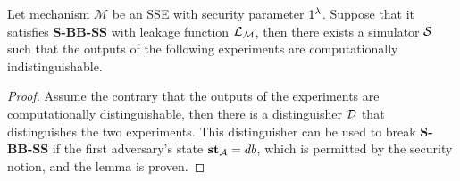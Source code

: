 \begin{lemma} \label{Lemma: S-BB-SS with db}
	\normalfont
	Let mechanism $\mathcal{M}$ be an SSE with security parameter $1^{\lambda}$. Suppose that it satisfies \textbf{S-BB-SS} with leakage function $\mathcal{L}_\mathcal{M}$, then there exists a simulator $\mathcal{S}$ such that the outputs of the following experiments are computationally indistinguishable.
	
	\begin{pchstack}[center]
		
		\pchspace
	\end{pchstack}
\end{lemma}


\begin{proof}
	Assume the contrary that the outputs of the experiments are computationally distinguishable, then there is a distinguisher $\mathcal{D}$ that distinguishes the two experiments. This distinguisher can be used to break \textbf{S-BB-SS} if the first adversary's state $\textbf{st}_{\mathcal{A}} = db$, which is permitted by the security notion, and the lemma is proven.
\end{proof}



